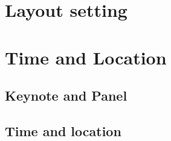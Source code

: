 
\ifJustHint \chapter{Layout setting} \fi
\newcommand{\showPaper}[1]{
\ifOnePage  \fi
\ifAllPage  \fi
}

\newcommand{\authorWidth}{9cm}
\newcommand{\titleWidth}{15cm}
\newcommand{\tableHeader}{ID & 作者 & 論文名稱 \\ \hline}

\newcommand{\updateNameNotify}{\newline \newline * 作者與論文名稱取自 \href{https://easychair.org/conferences/?conf=tcse2017}{EasyChair} 投稿系統的欄位訊息，若需修改可於 6/15 日前上系統更正。大會手冊最終版會以 [姓-名] (regular paper) 或 [First Name-Last Name] (English paper) 的格式呈現。}

\ifJustHint \chapter{Time and Location} \fi

\ifJustHint \section{Keynote and Panel} \fi

\newcommand{\TimeKeynoteOne}{時間: 9:30-10:20, 7/7}
\newcommand{\TimeKeynoteTwo}{時間: 9:30-10:20, 7/8}
\newcommand{\TimePanel}{時間: 16:50, 7/7}
\newcommand{\LocationKeynoteOne}{地點：學思樓 第九國際會議廳}
\newcommand{\LocationKeynoteTwo}{地點：學思樓 第九國際會議廳}
\newcommand{\LocationPanel}{地點：學思樓 第九國際會議廳}

\newcommand{\TimeIndustryOne}{時間：13:20-14:05 (2D), 7/7}
\newcommand{\TimeIndustryTwo}{時間：14:05-14:50 (2D), 7/7}
\newcommand{\TimeIndustryThree}{時間：10:40-11:25 (4D), 7/8}
\newcommand{\LocationIndustryOne}{地點：學思樓 第九國際會議廳}
\newcommand{\LocationIndustryTwo}{地點：學思樓 第九國際會議廳}
\newcommand{\LocationIndustryThree}{地點：學思樓 第九國際會議廳}

\ifJustHint \section{Time and location} \fi

